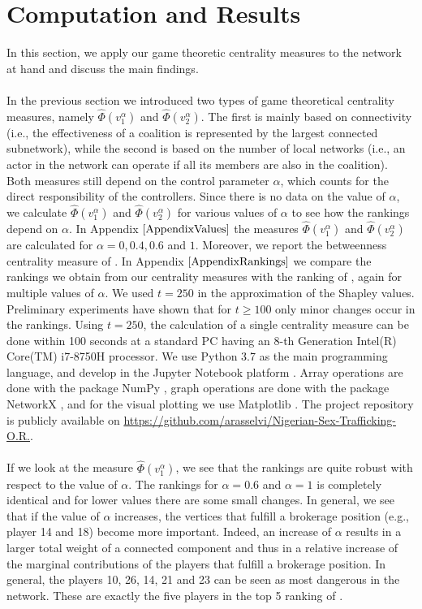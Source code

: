 \documentclass[10p]{article}
\theoremstyle{definition}
\theoremstyle{definition}
\begin{document}
\section{Computation and Results}
In this section, we apply our game theoretic centrality measures to the network at hand and discuss the main findings. \\ \\
In the previous section we introduced two types of game theoretical centrality measures, namely $\hat{\Phi}(v_1^\alpha)$ and $\hat{\Phi}(v_2^\alpha)$. The first is mainly based on connectivity (i.e., the effectiveness of a coalition is represented by the largest connected subnetwork), while the second is based on the number of local networks (i.e., an actor in the network can operate if all its members are also in the coalition). Both measures still depend on the control parameter $\alpha$, which counts for the direct responsibility of the controllers. Since there is no data on the value of $\alpha$, we calculate $\hat{\Phi}(v_1^\alpha)$ and $\hat{\Phi}(v_2^\alpha)$ for various values of $\alpha$ to see how the rankings depend on $\alpha$. In Appendix $\ref{AppendixValues}$ the measures $\hat{\Phi}(v_1^\alpha)$ and $\hat{\Phi}(v_2^\alpha)$ are calculated for $\alpha = 0, 0.4, 0.6$ and $1$. Moreover, we report the betweenness centrality measure of \cite{mancuso2014not}. In Appendix $\ref{AppendixRankings}$ we compare the rankings we obtain from our centrality measures with the ranking of \cite{mancuso2014not}, again for multiple values of $\alpha$. We used $t = 250$ in the approximation of the Shapley values. Preliminary experiments have shown that for $t \geq 100$ only minor changes occur in the rankings. Using $t = 250$, the calculation of a single centrality measure can be done within 100 seconds at a standard PC having an 8-th Generation Intel(R) Core(TM) i7-8750H processor.  We use Python 3.7 \cite{Rossum:1995:PRM:869369} as the main programming language, and develop in the Jupyter Notebook platform \cite{Kluyver:2016aa}. Array operations are done with the package NumPy \cite{numpy}, graph operations are done with the package NetworkX \cite{team2014networkx}, and for the visual plotting we use Matplotlib \cite{Hunter:2007}. The project repository is publicly available on \url{https://github.com/arasselvi/Nigerian-Sex-Trafficking-O.R.}. \\ \\
If we look at the measure $\hat{\Phi}(v_1^\alpha)$, we see that the rankings are quite robust with respect to the value of $\alpha$. The rankings for $\alpha = 0.6$ and $\alpha = 1$ is completely identical and for lower values there are some small changes. In general, we see that if the value of $\alpha$ increases, the vertices that fulfill a brokerage position (e.g., player 14 and 18) become more important. Indeed, an increase of $\alpha$ results in a larger total weight of a connected component and thus in a relative increase of the marginal contributions of the players that fulfill a brokerage position. In general, the players 10, 26, 14, 21 and 23 can be seen as most dangerous in the network. These are exactly the five players in the top 5 ranking of \cite{mancuso2014not}. 
\end{document}
